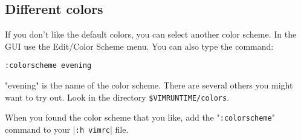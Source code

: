 \subsection{Different colors}
\label{syn-default-override}

If you don't like the default colors, you can select another color scheme.
In the GUI use the Edit/Color Scheme menu.
You can also type the command:

 \begin{Verbatim}[samepage=true]
 :colorscheme evening
 \end{Verbatim}

"evening" is the name of the color scheme.
There are several others you might want to try out.
Look in the directory \verb!$VIMRUNTIME/colors!.

When you found the color scheme that you like, add the "\verb!:colorscheme!" command to your |\verb!:h vimrc!| file.

